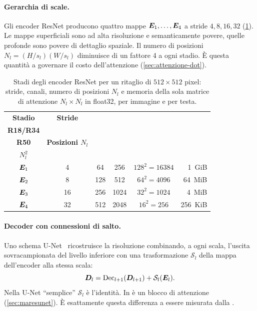 \paragraph{Gerarchia di scale.}
Gli encoder ResNet producono quattro mappe $\bm{E}_1,\dots,\bm{E}_4$ a stride $4,8,16,32$
(\cref{tab:stadi-resnet}). Le mappe superficiali sono ad alta risoluzione e semanticamente
povere, quelle profonde sono povere di dettaglio spaziale. Il numero di posizioni
$N_l=(H/s_l)(W/s_l)$ diminuisce di un fattore 4 a ogni stadio. È questa quantità a governare il
costo dell'attenzione (\cref{sec:attenzione-dot}).

\begin{table}[t]
  \centering
  \small
  \caption[Stadi degli encoder ResNet per un ritaglio di 512 pixel]{Stadi degli encoder ResNet
    per un ritaglio di $512\times512$ pixel: stride, canali, numero di posizioni $N_l$ e memoria
    della sola matrice di attenzione $N_l\times N_l$ in float32, per immagine e per testa.}
  \label{tab:stadi-resnet}
  \begin{tabular}{|c|c|c|c|c|r|}
    \hline
    \textbf{Stadio} & \textbf{Stride} & \makecell{\textbf{Canali}\\\textbf{R18/R34}} & \makecell{\textbf{Canali}\\\textbf{R50}} &
    \textbf{Posizioni $N_l$} & \makecell{\textbf{Memoria}\\\textbf{$N_l^2$}} \\
    \hline
    $\bm{E}_1$ & 4  & 64  & 256  & $128^2=\num{16384}$ & \SI{1}{GiB} \\
    $\bm{E}_2$ & 8  & 128 & 512  & $64^2=\num{4096}$   & \SI{64}{MiB} \\
    $\bm{E}_3$ & 16 & 256 & 1024 & $32^2=\num{1024}$   & \SI{4}{MiB} \\
    $\bm{E}_4$ & 32 & 512 & 2048 & $16^2=256$          & \SI{256}{KiB} \\
    \hline
  \end{tabular}
\end{table}

\paragraph{Decoder con connessioni di salto.}
Uno schema U-Net~\cite{ronneberger2015unet} ricostruisce la risoluzione combinando, a ogni scala,
l'uscita sovracampionata del livello inferiore con una trasformazione $\mathcal{S}_l$ della
mappa dell'encoder alla stessa scala:
\begin{equation}
  \bm{D}_l=\mathrm{Dec}_{l+1}(\bm{D}_{l+1})+\mathcal{S}_l(\bm{E}_l).
  \label{eq:decoder}
\end{equation}
Nella U-Net \enquote{semplice} $\mathcal{S}_l$ è l'identità. In \maresunet{} è un blocco di
attenzione (\cref{sec:maresunet}). È esattamente questa differenza a essere misurata dalla
.

